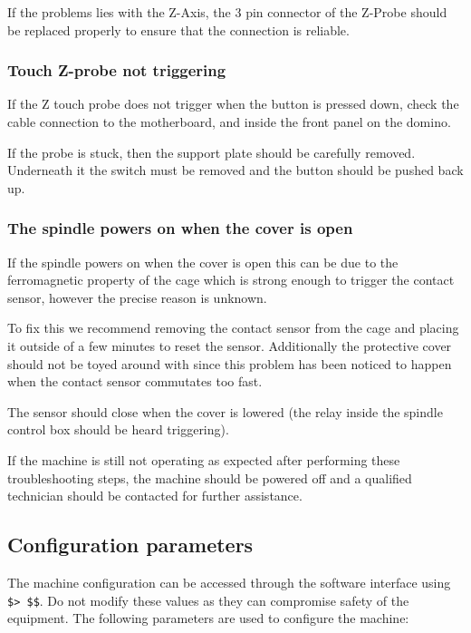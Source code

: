 \documentclass[11pt, openright]{book}
\begin{document}
        If the problems lies with the Z-Axis, the 3 pin connector of the Z-Probe should be replaced properly to ensure that the connection is reliable.

     \subsubsection{Touch Z-probe not triggering}

        If the Z touch probe does not trigger when the button is pressed down, check the cable connection to the motherboard, and inside the front panel on the domino. 

        If the probe is stuck, then the support plate should be carefully removed. Underneath it the switch must be removed and the button should be pushed back up. 

      \subsubsection{The spindle powers on when the cover is open}

        If the spindle powers on when the cover is open this can be due to the ferromagnetic property of the cage which is strong enough to trigger the contact sensor, however the precise reason is unknown. 

        To fix this we recommend removing the contact sensor from the cage and placing it outside of a few minutes to reset the sensor. Additionally the protective cover should not be toyed around with since this problem has been noticed to happen when the contact sensor commutates too fast. 
        
        The sensor should close when the cover is lowered (the relay inside the spindle control box should be heard triggering).  
  

       If the machine is still not operating as expected after performing these troubleshooting steps, the machine should be powered off and a qualified technician should be contacted for further assistance.

       \subsection{Configuration parameters}

         The machine configuration can be accessed through the software interface using \texttt{\$> \$\$}. Do not modify these values as they can compromise safety of the equipment. The following parameters are used to configure the machine:
 
\end{document}
